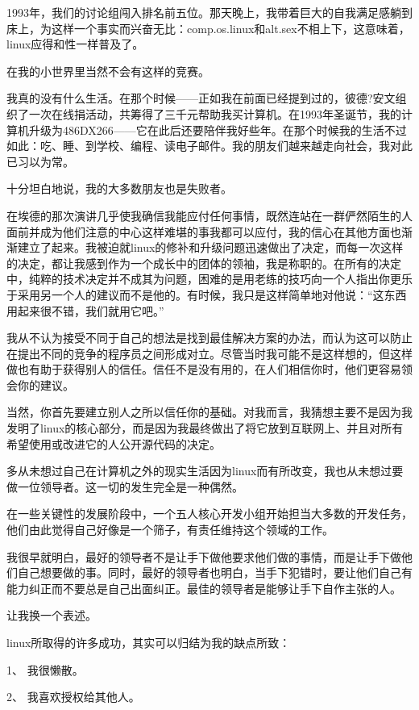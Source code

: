 1993年，我们的讨论组闯入排名前五位。那天晚上，我带着巨大的自我满足感躺到床上，为这样一个事实而兴奋无比：comp.os.linux和alt.sex不相上下，这意味着，linux应得和性一样普及了。

 

在我的小世界里当然不会有这样的竞赛。

我真的没有什么生活。在那个时候——正如我在前面已经提到过的，彼德?安文组织了一次在线捐活动，共筹得了三千元帮助我买计算机。在1993年圣诞节，我的计算机升级为486DX266——它在此后还要陪伴我好些年。在那个时候我的生活不过如此：吃、睡、到学校、编程、读电子邮件。我的朋友们越来越走向社会，我对此已习以为常。

十分坦白地说，我的大多数朋友也是失败者。

在埃德的那次演讲几乎使我确信我能应付任何事情，既然连站在一群俨然陌生的人面前并成为他们注意的中心这样难堪的事我都可以应付，我的信心在其他方面也渐渐建立了起来。我被迫就linux的修补和升级问题迅速做出了决定，而每一次这样的决定，都让我感到作为一个成长中的团体的领袖，我是称职的。在所有的决定中，纯粹的技术决定并不成其为问题，困难的是用老练的技巧向一个人指出你更乐于采用另一个人的建议而不是他的。有时候，我只是这样简单地对他说：“这东西用起来很不错，我们就用它吧。”

我从不认为接受不同于自己的想法是找到最佳解决方案的办法，而认为这可以防止在提出不同的竞争的程序员之间形成对立。尽管当时我可能不是这样想的，但这样做也有助于获得别人的信任。信任不是没有用的，在人们相信你时，他们更容易领会你的建议。

当然，你首先要建立别人之所以信任你的基础。对我而言，我猜想主要不是因为我发明了linux的核心部分，而是因为我最终做出了将它放到互联网上、并且对所有希望使用或改进它的人公开源代码的决定。

 

多从未想过自己在计算机之外的现实生活因为linux而有所改变，我也从未想过要做一位领导者。这一切的发生完全是一种偶然。

在一些关键性的发展阶段中，一个五人核心开发小组开始担当大多数的开发任务，他们由此觉得自己好像是一个筛子，有责任维持这个领域的工作。

我很早就明白，最好的领导者不是让手下做他要求他们做的事情，而是让手下做他们自己想要做的事。同时，最好的领导者也明白，当手下犯错时，要让他们自己有能力纠正而不要总是自己出面纠正。最佳的领导者是能够让手下自作主张的人。

让我换一个表述。

linux所取得的许多成功，其实可以归结为我的缺点所致：

1、 我很懒散。

2、 我喜欢授权给其他人。

